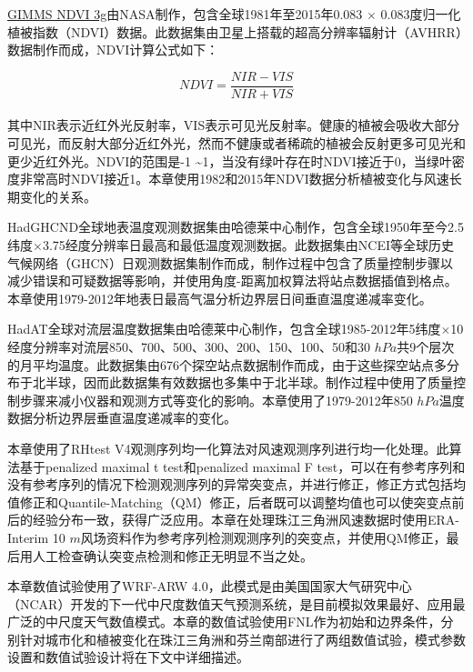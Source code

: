 \href{https://climatedataguide.ucar.edu/climate-data/ndvi-normalized-difference-vegetation-index-3rd-generation-nasagfsc-gimms}{GIMMS NDVI 3g}由NASA制作，包含全球1981年至2015年0.083 $\times$ 0.083度归一化植被指数（NDVI）数据。此数据集由卫星上搭载的超高分辨率辐射计（AVHRR）数据制作而成，NDVI计算公式如下：

\begin{equation} \label{eq:ndvi}
NDVI = \frac{NIR - VIS}{NIR + VIS}
\end{equation} ~\\
其中NIR表示近红外光反射率，VIS表示可见光反射率。健康的植被会吸收大部分可见光，而反射大部分近红外光，然而不健康或者稀疏的植被会反射更多可见光和更少近红外光。NDVI的范围是-1 \textasciitilde 1，当没有绿叶存在时NDVI接近于0，当绿叶密度非常高时NDVI接近1。本章使用1982和2015年NDVI数据分析植被变化与风速长期变化的关系。

HadGHCND全球地表温度观测数据集\citep{caesar2006large-scale}由哈德莱中心制作，包含全球1950年至今2.5纬度$\times$3.75经度分辨率日最高和最低温度观测数据。此数据集由NCEI等全球历史气候网络（GHCN）日观测数据集制作而成，制作过程中包含了质量控制步骤以减少错误和可疑数据等影响，并使用角度-距离加权算法将站点数据插值到格点。本章使用1979-2012年地表日最高气温分析边界层日间垂直温度递减率变化。

HadAT全球对流层温度数据集\citep{thorne2005revisiting}由哈德莱中心制作，包含全球1985-2012年5纬度$\times$10经度分辨率对流层850、700、500、300、200、150、100、50和30 $hPa$共9个层次的月平均温度。此数据集由676个探空站点数据制作而成，由于这些探空站点多分布于北半球，因而此数据集有效数据也多集中于北半球。制作过程中使用了质量控制步骤来减小仪器和观测方式等变化的影响。本章使用了1979-2012年850 $hPa$温度数据分析边界层垂直温度递减率的变化。

本章使用了RHtest V4观测序列均一化算法\citep{wang2014rhtests}对风速观测序列进行均一化处理。此算法基于penalized maximal t test\citep{wang2007penalized}和penalized maximal F test\citep{wang2008penalized}，可以在有参考序列和没有参考序列的情况下检测观测序列的异常突变点，并进行修正，修正方式包括均值修正和Quantile-Matching（QM）修正，后者既可以调整均值也可以使突变点前后的经验分布一致\citep{wang2010new}，获得广泛应用\citep{vincent2012second, baule2014climatology, yang2019causes}。本章在处理珠江三角洲风速数据时使用ERA-Interim 10 $m$风场资料作为参考序列检测观测序列的突变点，并使用QM修正，最后用人工检查确认突变点检测和修正无明显不当之处。

本章数值试验使用了WRF-ARW 4.0\citep{skamarock2019description}，此模式是由美国国家大气研究中心（NCAR）开发的下一代中尺度数值天气预测系统，是目前模拟效果最好、应用最广泛的中尺度天气数值模式。本章的数值试验使用FNL作为初始和边界条件，分别针对城市化和植被变化在珠江三角洲和芬兰南部进行了两组数值试验，模式参数设置和数值试验设计将在下文中详细描述。

